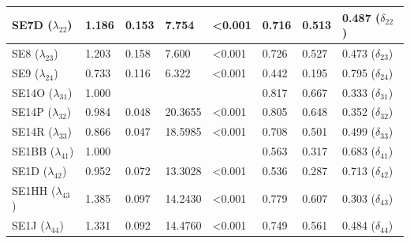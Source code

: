\documentclass[11pt]{article}
\begin{document}
\begin{table}[h!]
{\begin{tabular}{|l|l|l|l|l|l|l|l|}
SE7D \hfill ($\lambda_{22}$)      & 1.186            & 0.153                   &  7.754             & \textless 0.001    & 0.716                   &  0.513               & 0.487 \hfill ($\delta_{22}$)  \\ \hline
SE8  \hfill ($\lambda_{23}$)      & 1.203            & 0.158                   &  7.600             & \textless 0.001    & 0.726                   &  0.527               & 0.473 \hfill ($\delta_{23}$)  \\ \hline
SE9  \hfill ($\lambda_{24}$)      & 0.733            & 0.116                   &  6.322             & \textless 0.001    & 0.442                   &  0.195               & 0.795 \hfill ($\delta_{24}$)  \\ \hline
%                                                                                                                               
SE14O  \hfill ($\lambda_{31}$)    & 1.000            &                         &                    &                    & 0.817                   &  0.667               & 0.333 \hfill ($\delta_{31}$)  \\ \hline
SE14P  \hfill ($\lambda_{32}$)    & 0.984            & 0.048                   & 20.3655            & \textless 0.001    & 0.805                   &  0.648               & 0.352 \hfill ($\delta_{32}$)  \\ \hline
SE14R  \hfill ($\lambda_{33}$)    & 0.866            & 0.047                   & 18.5985            & \textless 0.001    & 0.708                   &  0.501               & 0.499 \hfill ($\delta_{33}$)  \\ \hline
%                                                                                                                               
SE1BB \hfill ($\lambda_{41}$)     & 1.000            &                         &                    &                    & 0.563                   &  0.317               & 0.683 \hfill ($\delta_{41}$)  \\ \hline
SE1D  \hfill ($\lambda_{42}$)     & 0.952            & 0.072                   & 13.3028            & \textless 0.001    & 0.536                   &  0.287               & 0.713 \hfill ($\delta_{42}$)  \\ \hline
SE1HH \hfill ($\lambda_{43}$)     & 1.385            & 0.097                   & 14.2430            & \textless 0.001    & 0.779                   &  0.607               & 0.303 \hfill ($\delta_{43}$)  \\ \hline
SE1J  \hfill ($\lambda_{44}$)     & 1.331            & 0.092                   & 14.4760            & \textless 0.001    & 0.749                   &  0.561               & 0.484 \hfill ($\delta_{44}$)  \\ \hline

\end{tabular}}
\end{table}
\end{document}
